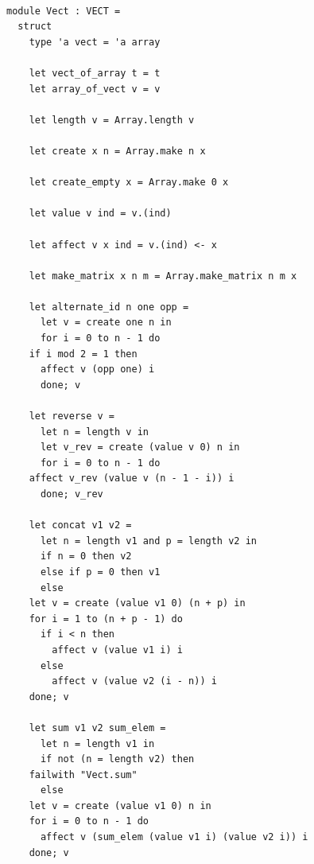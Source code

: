 \documentclass[a4paper,10pt]{report}
\theoremstyle{break}
\begin{document}
    \begin{lstlisting}

module Vect : VECT =
  struct
    type 'a vect = 'a array

    let vect_of_array t = t
    let array_of_vect v = v

    let length v = Array.length v
		
    let create x n = Array.make n x

    let create_empty x = Array.make 0 x

    let value v ind = v.(ind)

    let affect v x ind = v.(ind) <- x

    let make_matrix x n m = Array.make_matrix n m x

    let alternate_id n one opp =
      let v = create one n in
      for i = 0 to n - 1 do
	if i mod 2 = 1 then
	  affect v (opp one) i
      done; v

    let reverse v = 
      let n = length v in
      let v_rev = create (value v 0) n in
      for i = 0 to n - 1 do
	affect v_rev (value v (n - 1 - i)) i
      done; v_rev

    let concat v1 v2 = 
      let n = length v1 and p = length v2 in
      if n = 0 then v2
      else if p = 0 then v1
      else
	let v = create (value v1 0) (n + p) in
	for i = 1 to (n + p - 1) do
	  if i < n then 
	    affect v (value v1 i) i
	  else 
	    affect v (value v2 (i - n)) i
	done; v

    let sum v1 v2 sum_elem = 
      let n = length v1 in
      if not (n = length v2) then 
	failwith "Vect.sum"
      else
	let v = create (value v1 0) n in
	for i = 0 to n - 1 do
	  affect v (sum_elem (value v1 i) (value v2 i)) i
	done; v
	
    \end{lstlisting}
\newpage
\end{document}
